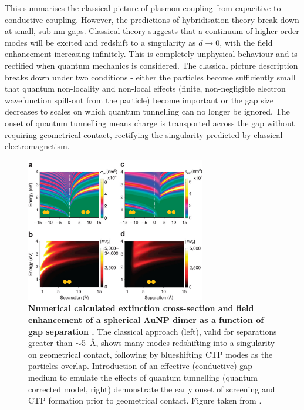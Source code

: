 \documentclass{article}
\begin{document}
This summarises the classical picture of plasmon coupling from capacitive to conductive coupling. However, the predictions of hybridisation theory break down at small, sub-nm gaps. Classical theory suggests that a continuum of higher order modes will be excited and redshift to a singularity as $d \rightarrow 0$, with the field enhancement increasing infinitely. This is completely unphysical behaviour and is rectified when quantum mechanics is considered.
The classical picture description breaks down under two conditions - either the particles become sufficiently small that quantum non-locality and non-local effects (finite, non-negligible electron wavefunction spill-out from the particle) become important or the gap size decreases to scales on which quantum tunnelling can no longer be ignored. The onset of quantum tunnelling means charge is transported across the gap without requiring geometrical contact, rectifying the singularity predicted by classical electromagnetism.

\begin{figure}[bt]
\centering
\includegraphics[width=0.7\textwidth]{figures/literature/ncomms1806-f4}
\caption[Numerical calculated extinction cross-section and field enhancement of a spherical AuNP dimer as a function of gap separation \cite{esteban2012}]{\textbf{Numerical calculated extinction cross-section and field enhancement of a spherical AuNP dimer as a function of gap separation \cite{esteban2012}.} The classical approach (left), valid for separations greater than $\sim$\SI{5}{\angstrom}, shows many modes redshifting into a singularity on geometrical contact, following by blueshifting CTP modes as the particles overlap. Introduction of an effective (conductive) gap medium to emulate the effects of quantum tunnelling (quantum corrected model, right) demonstrate the early onset of screening and CTP formation prior to geometrical contact. Figure taken from \cite{esteban2012}.}
\label{fig:optical_response_dimer}
\end{figure}
\end{document}
